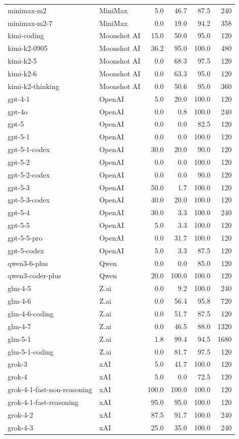 \begin{table}[htbp]
\begin{tabular}{llrrrr}
minimax-m2 & MiniMax & 5.0 & 46.7 & 87.5 & 240 \\
minimax-m2-7 & MiniMax & 0.0 & 19.0 & 94.2 & 358 \\
kimi-coding & Moonshot AI & 15.0 & 50.0 & 95.0 & 120 \\
kimi-k2-0905 & Moonshot AI & 36.2 & 95.0 & 100.0 & 480 \\
kimi-k2-5 & Moonshot AI & 0.0 & 68.3 & 97.5 & 120 \\
kimi-k2-6 & Moonshot AI & 0.0 & 63.3 & 95.0 & 120 \\
kimi-k2-thinking & Moonshot AI & 0.0 & 50.6 & 95.0 & 360 \\
gpt-4-1 & OpenAI & 5.0 & 20.0 & 100.0 & 120 \\
gpt-4o & OpenAI & 0.0 & 0.8 & 100.0 & 240 \\
gpt-5 & OpenAI & 0.0 & 0.0 & 82.5 & 120 \\
gpt-5-1 & OpenAI & 0.0 & 0.0 & 100.0 & 120 \\
gpt-5-1-codex & OpenAI & 30.0 & 20.0 & 90.0 & 120 \\
gpt-5-2 & OpenAI & 0.0 & 0.0 & 100.0 & 120 \\
gpt-5-2-codex & OpenAI & 0.0 & 0.0 & 90.0 & 120 \\
gpt-5-3 & OpenAI & 50.0 & 1.7 & 100.0 & 120 \\
gpt-5-3-codex & OpenAI & 40.0 & 20.0 & 100.0 & 120 \\
gpt-5-4 & OpenAI & 30.0 & 3.3 & 100.0 & 240 \\
gpt-5-5 & OpenAI & 5.0 & 3.3 & 100.0 & 120 \\
gpt-5-5-pro & OpenAI & 0.0 & 31.7 & 100.0 & 120 \\
gpt-5-codex & OpenAI & 5.0 & 3.3 & 87.5 & 120 \\
qwen3-6-plus & Qwen & 0.0 & 0.0 & 85.0 & 120 \\
qwen3-coder-plus & Qwen & 20.0 & 100.0 & 100.0 & 120 \\
glm-4-5 & Z.ai & 0.0 & 9.2 & 100.0 & 240 \\
glm-4-6 & Z.ai & 0.0 & 56.4 & 95.8 & 720 \\
glm-4-6-coding & Z.ai & 0.0 & 51.7 & 87.5 & 120 \\
glm-4-7 & Z.ai & 0.0 & 46.5 & 88.0 & 1320 \\
glm-5-1 & Z.ai & 1.8 & 99.4 & 94.5 & 1680 \\
glm-5-1-coding & Z.ai & 0.0 & 81.7 & 97.5 & 120 \\
grok-3 & xAI & 5.0 & 41.7 & 100.0 & 120 \\
grok-4 & xAI & 5.0 & 0.0 & 72.5 & 120 \\
grok-4-1-fast-non-reasoning & xAI & 100.0 & 100.0 & 100.0 & 120 \\
grok-4-1-fast-reasoning & xAI & 95.0 & 95.0 & 100.0 & 120 \\
grok-4-2 & xAI & 87.5 & 91.7 & 100.0 & 240 \\
grok-4-3 & xAI & 25.0 & 35.0 & 100.0 & 240 \\
\bottomrule
\end{tabular}
\end{table}
